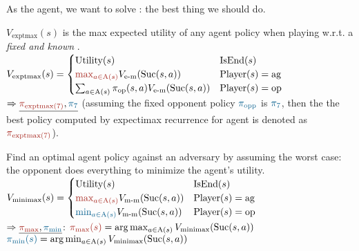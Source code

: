 As the agent, we want to solve : the best
thing we should do.

 $V_{\text{exptmax}}(s)$ is the max expected utility of any
agent policy when playing w.r.t. a \emph{fixed and known}
.
$V_{\text{exptmax}}(s) = \begin{cases}
    \text{Utility}(s) & \text{IsEnd}(s) \\
    \agentcolor{\max_{a \in \text{A}(s)}} V_{\text{e-m}}(\text{Suc}(s, a)) & \text{Player}(s) = \text{ag} \\
    \sum_{a \in \text{A}(s)} \pi_{\text{op}}(s, a) V_{\text{e-m}}(\text{Suc}(s, a)) & \text{Player}(s) = \text{op} \\
\end{cases}$ \\
$\Rightarrow \underline{\agentcolor{\pi_{\text{exptmax}(7)}},
\oppcolor{\pi_{\text{7}}}}$ (assuming the fixed opponent policy
$\oppcolor{\pi_{\text{opp}}}$ is $\oppcolor{\pi_{\text{7}}}$, then the the best
policy computed by expectimax recurrence for agent is denoted as
$\agentcolor{\pi_{\text{exptmax}(7)}}$).

 Find an optimal agent policy against an adversary by assuming the
worst case: the opponent does everything to minimize the agent's utility.
$V_{\text{minimax}}(s) = \begin{cases}
    \text{Utility}(s) & \text{IsEnd}(s) \\
    \agentcolor{\max_{a \in \text{A}(s)}} V_{\text{m-m}}(\text{Suc}(s, a)) & \text{Player}(s) = \text{ag} \\
    \oppcolor{\min_{a \in \text{A}(s)}} V_{\text{m-m}}(\text{Suc}(s, a)) & \text{Player}(s) = \text{op} \\
\end{cases}$\\
$\Rightarrow \underline{\agentcolor{\pi_{\text{max}}}, \oppcolor{\pi_{\text{min}}}}$:
$\agentcolor{\pi_{\text{max}}(s)} = \arg \max_{a \in \text{A}(s)} V_{\text{minimax}}(\text{Suc}(s, a))$\\
$\oppcolor{\pi_{\text{min}}(s)} = \arg \min_{a \in \text{A}(s)} V_{\text{minimax}}(\text{Suc}(s, a))$\\

